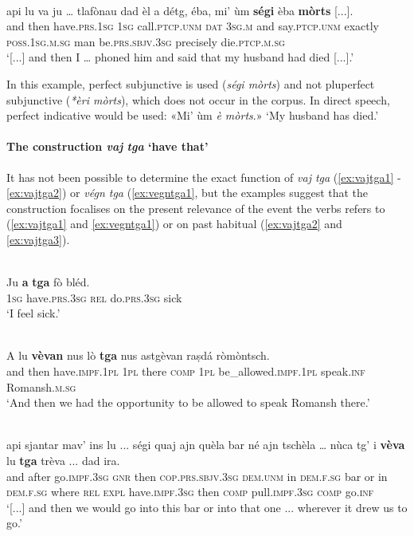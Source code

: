 \ea
\label{ex:notenseagr}
\\
\gll  [...] api lu va ju … tlafònau dad èl a détg, éba, mi' ùm \textbf{ségi} èba \textbf{mòrts} [...]. \\
{} and then have.\textsc{prs.1sg} \textsc{1sg} {} call.\textsc{ptcp.unm} \textsc{dat} \textsc{3sg.m} and say.\textsc{ptcp.unm} exactly \textsc{poss.1sg.m.sg} man be.\textsc{prs.sbjv.3sg} precisely die.\textsc{ptcp.m.sg} \\ 
\glt `[...] and then I … phoned him and said that my husband had died [...].'
\z

In this example, perfect subjunctive is used (\textit{ségi mòrts}) and not pluperfect subjunctive (\textit{*èri mòrts}), which does not occur in the corpus. In direct speech, perfect indicative would be used: «Mi' ùm \textit{è mòrts}.» `My husband has died.'

\paragraph{The construction \textit{vaj} \textit{tga} `have that'}
It has not been possible to determine the exact function of \textit{vaj tga} (\ref{ex:vajtga1} - \ref{ex:vajtga2}) or \textit{végn tga} (\ref{ex:vegntga1}, but the examples suggest that the construction focalises on the present relevance of the event the verbs refers to (\ref{ex:vajtga1} and \ref{ex:vegntga1}) or on past habitual (\ref{ex:vajtga2} and \ref{ex:vajtga3}).

\ea
\label{ex:vajtga1}
\\
\gll  Ju \textbf{a} \textbf{tga} fò bléd.\\
\textsc{1sg} have.\textsc{prs.3sg} \textsc{rel} do.\textsc{prs.3sg} sick\\
\glt `I feel sick.'
\z

\ea
\label{ex:vajtga2}
\\
\gll    A lu \textbf{vèvan} nus lò \textbf{tga} nus astgèvan raṣdá ròmòntsch.\\
and then have.\textsc{impf.1pl} \textsc{1pl} there \textsc{comp} \textsc{1pl} be\_allowed.\textsc{impf.1pl} speak.\textsc{inf} Romansh.\textsc{m.sg} \\
\glt `And then we had the opportunity to be allowed to speak Romansh there.'
\z

\ea
\label{ex:vajtga3}
\\
\gll  [...] api sjantar mav’ ins lu ... ségi quaj ajn quèla bar né ajn tschèla … nùca tg’ i \textbf{vèva} lu \textbf{tga} trèva ... dad ira.  \\
{} and after go.\textsc{impf.3sg} \textsc{gnr} then {} \textsc{cop.prs.sbjv.3sg} \textsc{dem.unm} in \textsc{dem.f.sg} bar or in \textsc{dem.f.sg} {} where \textsc{rel} \textsc{expl} have.\textsc{impf.3sg} then \textsc{comp} pull.\textsc{impf.3sg} {} \textsc{comp} go.\textsc{inf}\\
\glt `[...] and then we would go into this bar or into that one ... wherever it drew us to go.'
\z

